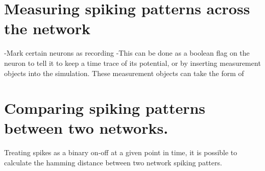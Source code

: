 \section{Measuring spiking patterns across the network}

-Mark certain neurons as recording
-This can be done as a boolean flag on the neuron to tell it to keep a time
trace of its potential, or by inserting measurement objects into the simulation.
These measurement objects can take the form of 

\section{Comparing spiking patterns between two networks.}

Treating spikes as a binary on-off at a given point in time, it is possible to
calculate the hamming distance between two network spiking patters. 
